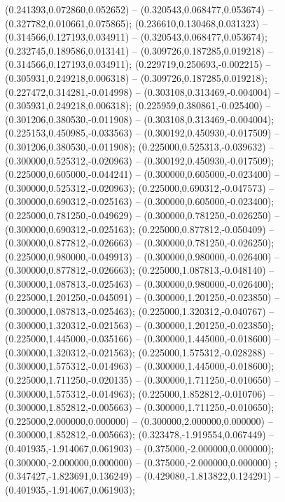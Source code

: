  (0.241393,0.072860,0.052652) -- (0.320543,0.068477,0.053674) -- (0.327782,0.010661,0.075865);
 (0.236610,0.130468,0.031323) -- (0.314566,0.127193,0.034911) -- (0.320543,0.068477,0.053674);
 (0.232745,0.189586,0.013141) -- (0.309726,0.187285,0.019218) -- (0.314566,0.127193,0.034911);
 (0.229719,0.250693,-0.002215) -- (0.305931,0.249218,0.006318) -- (0.309726,0.187285,0.019218);
 (0.227472,0.314281,-0.014998) -- (0.303108,0.313469,-0.004004) -- (0.305931,0.249218,0.006318);
 (0.225959,0.380861,-0.025400) -- (0.301206,0.380530,-0.011908) -- (0.303108,0.313469,-0.004004);
 (0.225153,0.450985,-0.033563) -- (0.300192,0.450930,-0.017509) -- (0.301206,0.380530,-0.011908);
 (0.225000,0.525313,-0.039632) -- (0.300000,0.525312,-0.020963) -- (0.300192,0.450930,-0.017509);
 (0.225000,0.605000,-0.044241) -- (0.300000,0.605000,-0.023400) -- (0.300000,0.525312,-0.020963);
 (0.225000,0.690312,-0.047573) -- (0.300000,0.690312,-0.025163) -- (0.300000,0.605000,-0.023400);
 (0.225000,0.781250,-0.049629) -- (0.300000,0.781250,-0.026250) -- (0.300000,0.690312,-0.025163);
 (0.225000,0.877812,-0.050409) -- (0.300000,0.877812,-0.026663) -- (0.300000,0.781250,-0.026250);
 (0.225000,0.980000,-0.049913) -- (0.300000,0.980000,-0.026400) -- (0.300000,0.877812,-0.026663);
 (0.225000,1.087813,-0.048140) -- (0.300000,1.087813,-0.025463) -- (0.300000,0.980000,-0.026400);
 (0.225000,1.201250,-0.045091) -- (0.300000,1.201250,-0.023850) -- (0.300000,1.087813,-0.025463);
 (0.225000,1.320312,-0.040767) -- (0.300000,1.320312,-0.021563) -- (0.300000,1.201250,-0.023850);
 (0.225000,1.445000,-0.035166) -- (0.300000,1.445000,-0.018600) -- (0.300000,1.320312,-0.021563);
 (0.225000,1.575312,-0.028288) -- (0.300000,1.575312,-0.014963) -- (0.300000,1.445000,-0.018600);
 (0.225000,1.711250,-0.020135) -- (0.300000,1.711250,-0.010650) -- (0.300000,1.575312,-0.014963);
 (0.225000,1.852812,-0.010706) -- (0.300000,1.852812,-0.005663) -- (0.300000,1.711250,-0.010650);
 (0.225000,2.000000,0.000000) -- (0.300000,2.000000,0.000000) -- (0.300000,1.852812,-0.005663);
 (0.323478,-1.919554,0.067449) -- (0.401935,-1.914067,0.061903) -- (0.375000,-2.000000,0.000000);
 (0.300000,-2.000000,0.000000) -- (0.375000,-2.000000,0.000000) ;
 (0.347427,-1.823691,0.136249) -- (0.429080,-1.813822,0.124291) -- (0.401935,-1.914067,0.061903);
